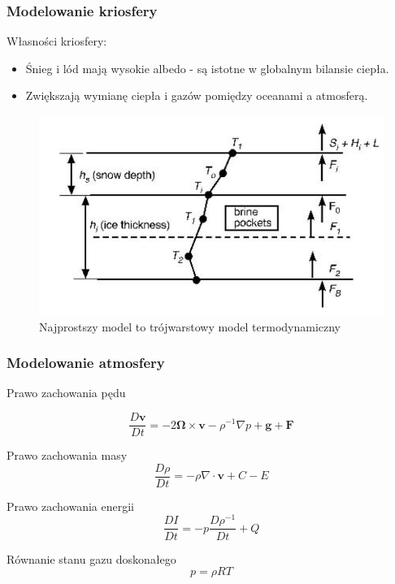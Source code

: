\documentclass{beamer}
\begin{document}
\begin{frame}
	\frametitle{Modelowanie kriosfery}
	Własności kriosfery:
	\begin{itemize}
		\item Śnieg i lód mają wysokie albedo - są istotne w globalnym bilansie ciepła. 
		\item Zwiększają wymianę ciepła i gazów pomiędzy oceanami a atmosferą.
	\end{itemize}
	\begin{figure}[h]
		\begin{center}
			\includegraphics[width=0.6\linewidth]{images/Figure7.png}
			\caption{Najprostszy model to trójwarstowy model termodynamiczny}
		\end{center}
	\end{figure}
	
\end{frame}


\begin{frame}
	\frametitle{Modelowanie atmosfery}
	\begin{block}{Prawo zachowania pędu}
		
		\[\frac{D\mathbf{v}}{Dt} = -2 \mathbf{\Omega} \times \mathbf{v} - \rho^{-1}
		\nabla p + \mathbf{g} + \mathbf{F}
		\]
		
	\end{block}
	
	\begin{block}{Prawo zachowania masy}
		\[\frac{D\rho}{Dt} = -\rho\nabla \cdot \mathbf{v} + C - E
		\]
	\end{block}
	
	\begin{block}{Prawo zachowania energii}
		\[\frac{DI}{Dt} = -p\frac{D\rho^{-1}}{Dt} + Q
		\]
	\end{block}
	
	\begin{block}{Równanie stanu gazu doskonałego}		
		\[p=\rho RT
		\]
	\end{block}
	
\end{frame}
\end{document}
